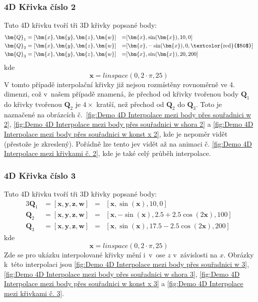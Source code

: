 \subsubsection{4D Křivka číslo 2}
Tuto 4D křivku tvoří tři 3D křivky popsané body:
\begin{alignat}{3}
    \bm{Q}_1 & = [\bm{x}, \bm{y}, \bm{z}, \bm{w}] & = & [\bm{x}, \sin(\bm{x}), 10, 0]                            \\
    \bm{Q}_2 & = [\bm{x}, \bm{y}, \bm{z}, \bm{w}] & = & [\bm{x}, -\sin(\bm{x}), 0, \text{\textcolor{red}{$50$}}] \\
    \bm{Q}_3 & = [\bm{x}, \bm{y}, \bm{z}, \bm{w}] & = & [\bm{x}, \sin(\bm{x}), 20, 200]
\end{alignat}
kde
\begin{equation}
    \bm{x} = linspace(0, 2\cdot\pi, 25)
\end{equation}
V tomto případě interpolační křivky již nejsou rozmístěny rovnoměrně ve 4. dimenzi,
což v~našem případě znamená, že přechod od křivky tvořenou body $\bm{Q}_1$ do křivky
tvořenou $\bm{Q}_2$ je $4\times$ kratší, než přechod od $\bm{Q}_2$ do $\bm{Q}_3$. Toto
je naznačené na obrázcích č.~\ref{fig:Demo 4D Interpolace mezi body přes souřadnici w 2},
\ref{fig:Demo 4D Interpolace mezi body přes souřadnici w shora 2} a
\ref{fig:Demo 4D Interpolace mezi body přes souřadnici w konst x 2},
kde je nepoměr vidět (přestože je zkreslený).
Pořádně lze tento jev vidět až na animaci č. \ref{fig:Demo 4D Interpolace mezi křivkami č. 2},
kde je také celý průběh interpolace.

\subsubsection{4D Křivka číslo 3}
Tuto 4D křivku tvoří tři 3D křivky popsané body:
\begin{alignat}{3}
    \bm{Q}_1 & = [\bm{x}, \bm{y}, \bm{z}, \bm{w}] & = & [\bm{x}, \sin(\bm{x}), 10, 0]                        \\
    \bm{Q}_2 & = [\bm{x}, \bm{y}, \bm{z}, \bm{w}] & = & [\bm{x}, -\sin(\bm{x}), 2.5 + 2.5\cos(2\bm{x}), 100] \\
    \bm{Q}_3 & = [\bm{x}, \bm{y}, \bm{z}, \bm{w}] & = & [\bm{x}, \sin(\bm{x}), 17.5 - 2.5\cos(2\bm{x}), 200]
\end{alignat}
kde
\begin{equation}
    \bm{x} = linspace(0, 2\cdot\pi, 25)
\end{equation}
Zde se pro ukázku interpolované křivky mění i~v~ose $z$ v~závislosti na $x$.
Obrázky k~této interpolaci jsou \ref{fig:Demo 4D Interpolace mezi body přes souřadnici w 3},
\ref{fig:Demo 4D Interpolace mezi body přes souřadnici w shora 3},
\ref{fig:Demo 4D Interpolace mezi body přes souřadnici w konst x 3} a
\ref{fig:Demo 4D Interpolace mezi křivkami č. 3}.

